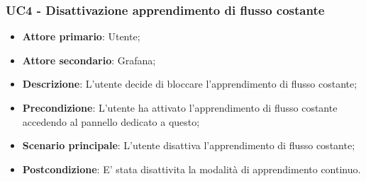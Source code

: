 \subsubsection{UC4 - Disattivazione apprendimento di flusso costante}
\label{sssec:uc4}
\begin{itemize}
  \item \textbf{Attore primario}: Utente;
  \item \textbf{Attore secondario}: Grafana;
  \item \textbf{Descrizione}: L'utente decide di bloccare l'apprendimento di flusso costante;
  \item \textbf{Precondizione}: L'utente ha attivato l'apprendimento di flusso costante accedendo al pannello dedicato a questo;
  \item \textbf{Scenario principale}: L'utente disattiva l'apprendimento di flusso costante;
  \item \textbf{Postcondizione}: E' stata disattivita la modalità di apprendimento continuo.
\end{itemize}
